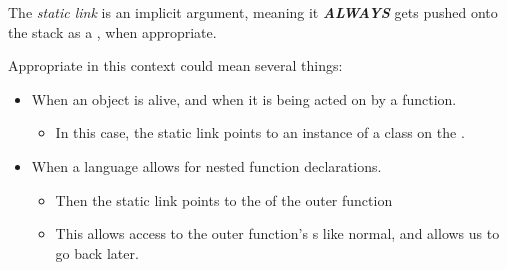 \begin{definition}\label{def:Static_Link}
  The \emph{static link} is an implicit argument, meaning it \textbf{\emph{ALWAYS}} gets pushed onto the stack as a , when appropriate.
  
  Appropriate in this context could mean several things:
  \begin{itemize}[noitemsep]
  \item When an object is alive, and when it is being acted on by a function.
    \begin{itemize}[noitemsep]
    \item In this case, the static link points to an instance of a class on the .
    \end{itemize}
  \item When a language allows for nested function declarations.
    \begin{itemize}[noitemsep]
    \item Then the static link points to the  of the outer function
    \item This allows access to the outer function's s like normal, and allows us to go back later.
    \end{itemize}
  \end{itemize}
\end{definition}

